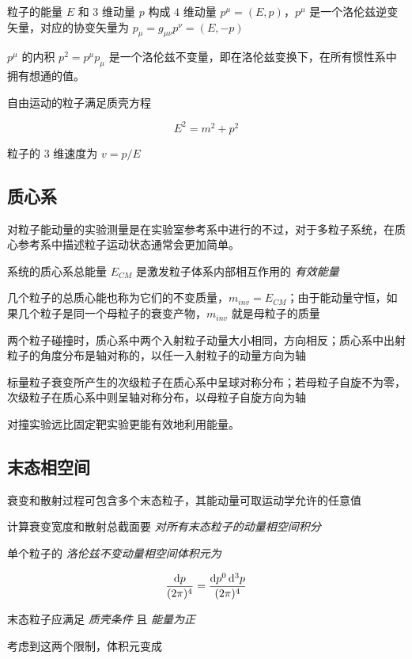 粒子的能量 $E$ 和 $3$ 维动量 $p$ 构成 $4$ 维动量 $p^\mu=(E,p)$，$p^\mu$ 是一个洛伦兹逆变矢量，对应的协变矢量为 $p_\mu=g_{\mu\nu} p^\nu=(E,-p)$

$p^\mu$ 的内积 $p^2=p^\mu p_\mu$ 是一个洛伦兹不变量，即在洛伦兹变换下，在所有惯性系中拥有想通的值。

自由运动的粒子满足质壳方程

\begin{equation}
    E^2 = m^2 + p^2
\end{equation}

粒子的 $3$ 维速度为 $v=p/E$

\subsection{质心系}

对粒子能动量的实验测量是在实验室参考系中进行的不过，对于多粒子系统，在质心参考系中描述粒子运动状态通常会更加简单。

系统的质心系总能量 $E_{CM}$ 是激发粒子体系内部相互作用的 \emph{有效能量}

几个粒子的总质心能也称为它们的不变质量，$m_{inv}=E_{CM}$；由于能动量守恒，如果几个粒子是同一个母粒子的衰变产物，$m_{inv}$ 就是母粒子的质量

两个粒子碰撞时，质心系中两个入射粒子动量大小相同，方向相反；质心系中出射粒子的角度分布是轴对称的，以任一入射粒子的动量方向为轴

标量粒子衰变所产生的次级粒子在质心系中呈球对称分布；若母粒子自旋不为零，次级粒子在质心系中则呈轴对称分布，以母粒子自旋方向为轴

对撞实验远比固定靶实验更能有效地利用能量。

\subsection{末态相空间}

衰变和散射过程可包含多个末态粒子，其能动量可取运动学允许的任意值

计算衰变宽度和散射总截面要 \emph{对所有末态粒子的动量相空间积分}

单个粒子的 \emph{洛伦兹不变动量相空间体积元为}

\begin{equation}
    \frac{\mathop{}\!\mathrm{d} p}{(2\pi)^4} = \frac{\mathop{}\!\mathrm{d} p^0 \mathop{}\!\mathrm{d}^3 p}{(2\pi)^4}
\end{equation}

末态粒子应满足 \emph{质壳条件} 且 \emph{能量为正}

考虑到这两个限制，体积元变成

